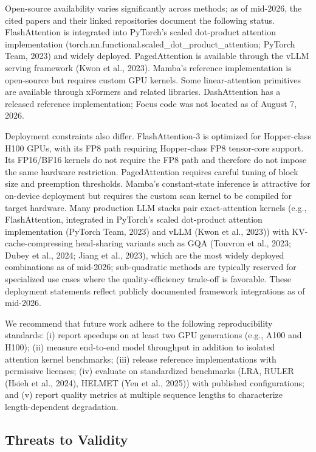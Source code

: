 \documentclass[10pt,twocolumn]{article}
\begin{document}
Open-source availability varies significantly across methods; as of mid-2026, the cited papers and their linked repositories document the following status. FlashAttention is integrated into PyTorch's scaled dot-product attention implementation (torch.nn.functional.scaled\_dot\_product\_attention; PyTorch Team, 2023) and widely deployed. PagedAttention is available through the vLLM serving framework (Kwon et al., 2023). Mamba's reference implementation is open-source but requires custom GPU kernels. Some linear-attention primitives are available through xFormers and related libraries. DashAttention has a released reference implementation; Focus code was not located as of August 7, 2026.

Deployment constraints also differ. FlashAttention-3 is optimized for Hopper-class H100 GPUs, with its FP8 path requiring Hopper-class FP8 tensor-core support. Its FP16/BF16 kernels do not require the FP8 path and therefore do not impose the same hardware restriction. PagedAttention requires careful tuning of block size and preemption thresholds. Mamba's constant-state inference is attractive for on-device deployment but requires the custom scan kernel to be compiled for target hardware. Many production LLM stacks pair exact-attention kernels (e.g., FlashAttention, integrated in PyTorch's scaled dot-product attention implementation (PyTorch Team, 2023) and vLLM (Kwon et al., 2023)) with KV-cache-compressing head-sharing variants such as GQA (Touvron et al., 2023; Dubey et al., 2024; Jiang et al., 2023), which are the most widely deployed combinations as of mid-2026; sub-quadratic methods are typically reserved for specialized use cases where the quality-efficiency trade-off is favorable. These deployment statements reflect publicly documented framework integrations as of mid-2026.

We recommend that future work adhere to the following reproducibility standards: (i) report speedups on at least two GPU generations (e.g., A100 and H100); (ii) measure end-to-end model throughput in addition to isolated attention kernel benchmarks; (iii) release reference implementations with permissive licenses; (iv) evaluate on standardized benchmarks (LRA, RULER (Hsieh et al., 2024), HELMET (Yen et al., 2025)) with published configurations; and (v) report quality metrics at multiple sequence lengths to characterize length-dependent degradation.

\subsection{Threats to Validity}\label{threats-to-validity}
\end{document}
